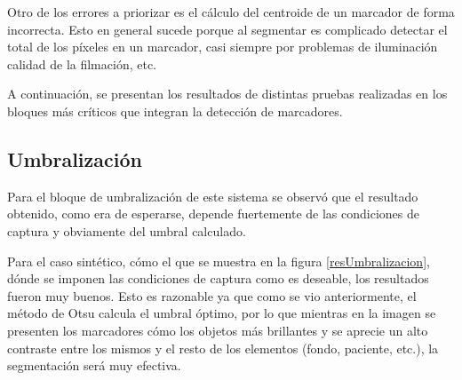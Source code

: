 Otro de los errores a priorizar es el cálculo del centroide de un marcador de forma incorrecta. Esto en general sucede porque al segmentar es complicado detectar el total de los píxeles en un marcador, casi siempre por problemas de iluminación calidad de la filmación, etc.

A continuación, se presentan los resultados de distintas pruebas realizadas en los bloques más críticos que integran la detección de marcadores.

\subsection{Umbralización}

Para el bloque de umbralización de este sistema se observó que el resultado obtenido, como era de esperarse, depende fuertemente de las condiciones de captura y obviamente del umbral calculado. 

Para el caso sintético, cómo el que se muestra en la figura \ref{resUmbralizacion}, dónde se imponen las condiciones de captura como es deseable, los resultados fueron muy buenos. Esto es razonable ya que como se vio anteriormente, el método de Otsu calcula el umbral óptimo, por lo que mientras en la imagen se presenten los marcadores cómo los objetos más brillantes y se aprecie un alto contraste entre los mismos y el resto de los elementos (fondo, paciente, etc.), la segmentación será muy efectiva.

